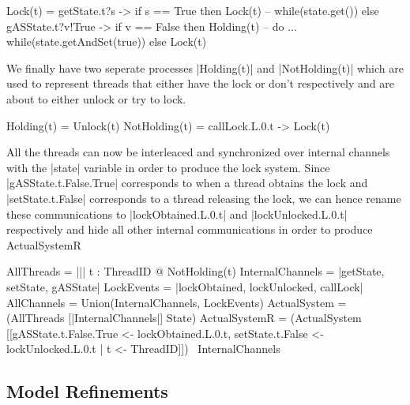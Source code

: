 \begin{cspm}
  Lock(t) =  getState.t?s -> if s == True then Lock(t) -- while(state.get()){ }
           else gASState.t?v!True -> if v == False then Holding(t) 
                -- do ... while(state.getAndSet(true))
           else Lock(t)
\end{cspm}

We finally have two seperate processes |Holding(t)| and |NotHolding(t)| which are used to represent threads that either have the lock or don't respectively and are about to either unlock or try to lock.

\begin{cspm}
  Holding(t) = Unlock(t)
  NotHolding(t) = callLock.L.0.t -> Lock(t)
\end{cspm}

All the threads can now be interleaced and synchronized over internal channels with the |state| variable in order to produce the lock system. Since |gASState.t.False.True| corresponds to when a thread obtains the lock and |setState.t.False| corresponds to a thread releasing the lock, we can hence rename these communications to |lockObtained.L.0.t| and |lockUnlocked.L.0.t| respectively and hide all other internal communications in order to produce ActualSystemR

\begin{cspm}
  AllThreads = ||| t : ThreadID @ NotHolding(t)
  InternalChannels = {|getState, setState, gASState|}
  LockEvents = {|lockObtained, lockUnlocked, callLock|}
  AllChannels = Union({InternalChannels, LockEvents})
  ActualSystem = (AllThreads [|InternalChannels|] State)
  ActualSystemR = (ActualSystem [[gASState.t.False.True <- lockObtained.L.0.t, setState.t.False <- lockUnlocked.L.0.t | t <- ThreadID]]) \ InternalChannels
\end{cspm}

\subsection{Model Refinements}

